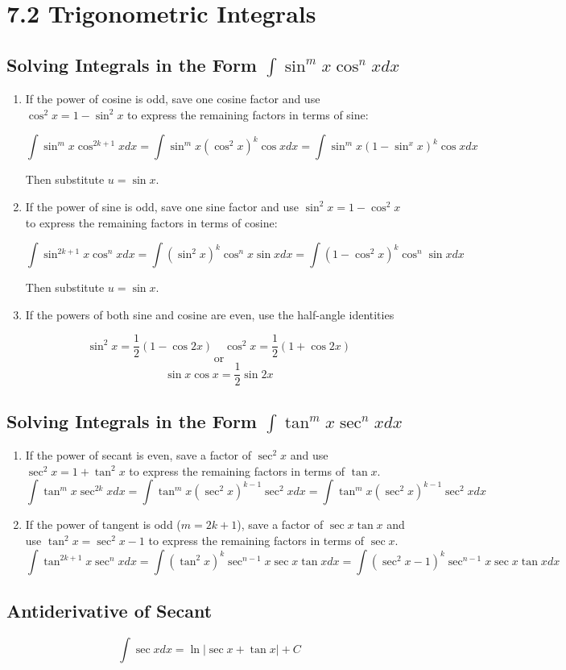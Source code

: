 %
%

\section*{7.2 Trigonometric Integrals}

\subsection*{Solving Integrals in the Form \( \int{\sin^m{x} \cos^n{x}} dx \)}

\begin{enumerate}

    \item If the power of cosine is odd, save one cosine factor and use \( \cos^2x=1- \sin^2x \) to express the remaining factors in terms of sine:

    \[ \int{\sin^m{x} \cos^{2k+1}x dx} = \int{\sin^m{x} {(\cos^2{x})}^k \cos{x} dx} = \int{\sin^m{x} {(1-\sin^{x}x)}^k \cos{x} dx} \]

    Then substitute \(u = \sin{x} \).

    \item If the power of sine is odd, save one sine factor and use \( \sin^2{x} = 1 - \cos^2{x} \) to express the remaining factors in terms of cosine:

    \[ \int{\sin^{2k+1}x \cos^{n}x dx} = \int{{(\sin^{2}x)}^k \cos^{n}x \sin{x} dx} = \int{{(1-\cos^2{x})}^k \cos^{n} \sin{x} dx} \] 

    Then substitute \(u=\sin{x}\).

    \item If the powers of both sine and cosine are even, use the half-angle identities

    \[ \sin^2{x} = \frac{1}{2}(1-\cos{2x}) \quad \cos^2{x} = \frac{1}{2} (1 + \cos{2x}) \]
    \[ \text{or} \] 
    \[ \sin{x}\cos{x} = \frac{1}{2}\sin{2x} \]
\end{enumerate}

\subsection*{Solving Integrals in the Form \(\int{\tan^m{x} \sec^n{x} dx} \)}

\begin{enumerate}
    \item If the power of secant is even, save a factor of \(\sec^2{x}\) and use \(\sec^2{x} = 1 + \tan^2{x}\) to express the remaining factors in terms of \(\tan{x}\). 
        \[ \int{\tan^m{x} \sec^{2k}x dx} = \int{\tan^{m}x {(\sec^2{x})}^{k-1}\sec^2{x}dx} = \int{\tan^{m}x{(\sec^2{x})}^{k-1}\sec^2{x} dx} \] 
    \item If the power of tangent is odd (\(m=2k+1\)), save a factor of \(\sec{x}\tan{x}\) and use \(\tan^2{x} = \sec^2{x} - 1\) to express the remaining factors in terms of \(\sec{x}\).
        \[ \int{\tan^{2k+1}x \sec^nx dx} = \int{{(\tan^2x)}^k \sec^{n-1}x \sec{x} \tan{x} dx} = \int{{(\sec^2{x} - 1)}^k \sec^{n-1}x \sec{x} \tan{x} dx} \]
\end{enumerate}

\subsection*{Antiderivative of Secant}

\[ \int{\sec{x} dx} = \ln{| \sec{x} + \tan{x} |} + C \]
